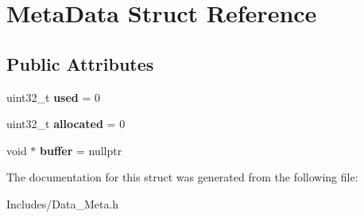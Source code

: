 \hypertarget{struct_meta_data}{}\section{Meta\+Data Struct Reference}
\label{struct_meta_data}
\subsection*{Public Attributes}
\begin{DoxyCompactItemize}
\item 
uint32\+\_\+t {\bfseries used} = 0\hypertarget{struct_meta_data_abdcac78a4eaf9c6e69d4fdc0c0f1a1cf}{}\label{struct_meta_data_abdcac78a4eaf9c6e69d4fdc0c0f1a1cf}

\item 
uint32\+\_\+t {\bfseries allocated} = 0\hypertarget{struct_meta_data_ad7f915f404b7b1b3d46a19b0fa6f9a0c}{}\label{struct_meta_data_ad7f915f404b7b1b3d46a19b0fa6f9a0c}

\item 
void $\ast$ {\bfseries buffer} = nullptr\hypertarget{struct_meta_data_a3d09d759d39ddf22e23b3783d82b1c68}{}\label{struct_meta_data_a3d09d759d39ddf22e23b3783d82b1c68}

\end{DoxyCompactItemize}


The documentation for this struct was generated from the following file\+:\begin{DoxyCompactItemize}
\item 
Includes/Data\+\_\+\+Meta.\+h\end{DoxyCompactItemize}
